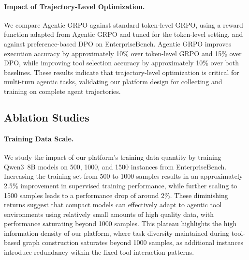 \documentclass{article}
\theoremstyle{plain}
\theoremstyle{definition}
\theoremstyle{remark}
\begin{document}
\paragraph{Impact of Trajectory-Level Optimization.}
We compare Agentic GRPO against standard token-level GRPO, using a reward function adapted from Agentic GRPO and tuned for the token-level setting, and against preference-based DPO on EnterpriseBench. Agentic GRPO improves execution accuracy by approximately 10\% over token-level GRPO and 15\% over DPO, while improving tool selection accuracy by approximately 10\% over both baselines. These results indicate that trajectory-level optimization is critical for multi-turn agentic tasks, validating our platform design for collecting and training on complete agent trajectories.



\vspace{-0.2cm}
\subsection{Ablation Studies}
\vspace{-0.2cm}
\paragraph{Training Data Scale.}
We study the impact of our platform's training data quantity by training Qwen3~8B models on 500, 1000, and 1500 instances from EnterpriseBench. Increasing the training set from 500 to 1000 samples results in an approximately 2.5\% improvement in supervised training performance, while further scaling to 1500 samples leads to a performance drop of around 2\%. These diminishing returns suggest that compact models can effectively adapt to agentic tool environments using relatively small amounts of high quality data, with performance saturating beyond 1000 samples. This plateau highlights the high information density of our platform, where task diversity maintained during tool-based graph construction saturates beyond 1000 samples, as additional instances introduce redundancy within the fixed tool interaction patterns.
\end{document}
